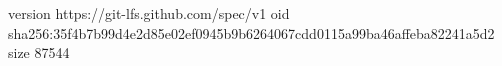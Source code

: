 version https://git-lfs.github.com/spec/v1
oid sha256:35f4b7b99d4e2d85e02ef0945b9b6264067cdd0115a99ba46affeba82241a5d2
size 87544
